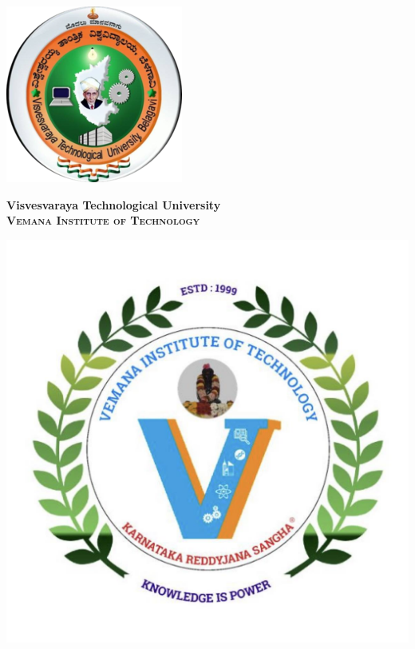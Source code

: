 \documentclass[a4paper,12pt]{article}
\begin{document}
\begin{minipage}{0.2\textwidth}
    \includegraphics[width=\textwidth]{vtulogo.png}
\end{minipage}
\begin{minipage}{0.5\textwidth}
    \centering
    \textbf{\Large Visvesvaraya Technological University} \\
    \vspace{0.2cm}
    \textbf{\textsc{\large Vemana Institute of Technology}} \\
\end{minipage}
\begin{minipage}{0.2\textwidth}
    \includegraphics[width=\textwidth]{vitlogo.jpg}
\end{minipage}
\end{document}
